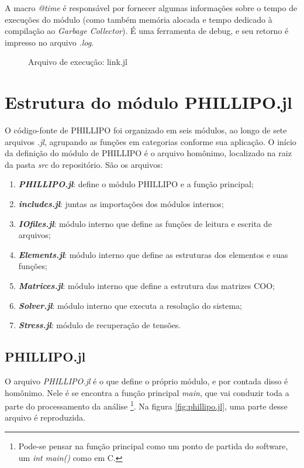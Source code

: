 A macro \emph{@time} é responsável por fornecer algumas informações sobre o tempo de execuções do módulo (como também memória alocada e tempo dedicado à compilação ao \emph{Garbage Collector}). É uma ferramenta de debug, e seu retorno é impresso no arquivo \emph{.log}.

\begin{figure}[hbtp]
    \caption{Arquivo de execução: link.jl}
    
    \label{fig:link.jl}
\end{figure}

\section{Estrutura do módulo PHILLIPO.jl}

O código-fonte de PHILLIPO foi organizado em seis módulos, ao longo de sete arquivos \emph{.jl}, agrupando as funções em categorias conforme sua aplicação. O início da definição do módulo de PHILLIPO é o arquivo homônimo, localizado na raiz da pasta \emph{src} do repositório. São os arquivos:

\begin{enumerate}
    \item \textbf{\emph{PHILLIPO.jl}}: define o módulo PHILLIPO e a função principal;
    \item \textbf{\emph{includes.jl}}: juntas as importações dos módulos internos;
    \item \textbf{\emph{IOfiles.jl}}: módulo interno que define as funções de leitura e escrita de arquivos;
    \item \textbf{\emph{Elements.jl}}: módulo interno que  define as estruturas dos elementos e suas funções;
    \item \textbf{\emph{Matrices.jl}}: módulo interno que define a estrutura das matrizes COO;
    \item \textbf{\emph{Solver.jl}}: módulo interno que executa a resolução do sistema;
    \item \textbf{\emph{Stress.jl}}: módulo de recuperação de tensões.
\end{enumerate}


\subsection{PHILLIPO.jl}

O arquivo \emph{PHILLIPO.jl} é o que define o próprio módulo, e por contada disso é homônimo. Nele é se encontra a função principal \emph{main}, que vai conduzir toda a parte do processamento da análise \footnote{Pode-se pensar na função principal como um ponto de partida do software, um \emph{int main()} como em C.}. Na figura \ref{fig:phillipo.jl}, uma parte desse arquivo é reproduzida. 

